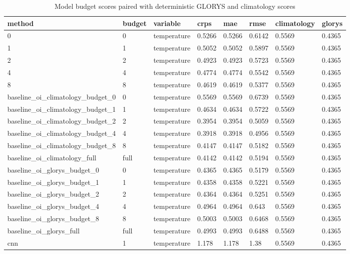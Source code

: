 \begin{table}[htbp]
\centering
\caption{Model budget scores paired with deterministic GLORYS and climatology scores}
\begin{tabular}{llllllll}
\toprule
method & budget & variable & crps & mae & rmse & climatology & glorys \\
\midrule
0 & 0 & temperature & 0.5266 & 0.5266 & 0.6142 & 0.5569 & 0.4365 \\
1 & 1 & temperature & 0.5052 & 0.5052 & 0.5897 & 0.5569 & 0.4365 \\
2 & 2 & temperature & 0.4923 & 0.4923 & 0.5723 & 0.5569 & 0.4365 \\
4 & 4 & temperature & 0.4774 & 0.4774 & 0.5542 & 0.5569 & 0.4365 \\
8 & 8 & temperature & 0.4619 & 0.4619 & 0.5377 & 0.5569 & 0.4365 \\
baseline\_oi\_climatology\_budget\_0 & 0 & temperature & 0.5569 & 0.5569 & 0.6739 & 0.5569 & 0.4365 \\
baseline\_oi\_climatology\_budget\_1 & 1 & temperature & 0.4634 & 0.4634 & 0.5722 & 0.5569 & 0.4365 \\
baseline\_oi\_climatology\_budget\_2 & 2 & temperature & 0.3954 & 0.3954 & 0.5059 & 0.5569 & 0.4365 \\
baseline\_oi\_climatology\_budget\_4 & 4 & temperature & 0.3918 & 0.3918 & 0.4956 & 0.5569 & 0.4365 \\
baseline\_oi\_climatology\_budget\_8 & 8 & temperature & 0.4147 & 0.4147 & 0.5182 & 0.5569 & 0.4365 \\
baseline\_oi\_climatology\_full & full & temperature & 0.4142 & 0.4142 & 0.5194 & 0.5569 & 0.4365 \\
baseline\_oi\_glorys\_budget\_0 & 0 & temperature & 0.4365 & 0.4365 & 0.5179 & 0.5569 & 0.4365 \\
baseline\_oi\_glorys\_budget\_1 & 1 & temperature & 0.4358 & 0.4358 & 0.5221 & 0.5569 & 0.4365 \\
baseline\_oi\_glorys\_budget\_2 & 2 & temperature & 0.4364 & 0.4364 & 0.5251 & 0.5569 & 0.4365 \\
baseline\_oi\_glorys\_budget\_4 & 4 & temperature & 0.4964 & 0.4964 & 0.643 & 0.5569 & 0.4365 \\
baseline\_oi\_glorys\_budget\_8 & 8 & temperature & 0.5003 & 0.5003 & 0.6468 & 0.5569 & 0.4365 \\
baseline\_oi\_glorys\_full & full & temperature & 0.4993 & 0.4993 & 0.6488 & 0.5569 & 0.4365 \\
cnn & 1 & temperature & 1.178 & 1.178 & 1.38 & 0.5569 & 0.4365 \\

\end{tabular}
\end{table}

